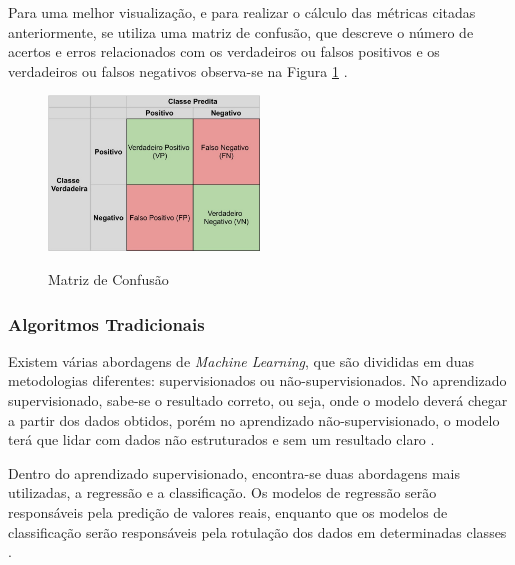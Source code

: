 Para uma melhor visualização, e para realizar o cálculo das métricas citadas anteriormente, se utiliza uma matriz de confusão, que descreve o número de acertos e erros relacionados com os verdadeiros ou falsos positivos e os verdadeiros ou falsos negativos observa-se na Figura \ref{fig:confusionMatrix} \cite{machineLearningTensorFlow}.

\begin{figure}[!htb]
	\centering
	\caption{Matriz de Confusão}
	\includegraphics[width=0.50\textwidth]{img/confusionMatrix.jpg}
	\label{fig:confusionMatrix}
\end{figure}

\subsubsection{Algoritmos Tradicionais}

Existem várias abordagens de \emph{Machine Learning}, que são divididas em duas metodologias diferentes: supervisionados ou não-supervisionados. No aprendizado supervisionado, sabe-se o resultado correto, ou seja, onde o modelo deverá chegar a partir dos dados obtidos, porém no aprendizado não-supervisionado, o modelo terá que lidar com dados não estruturados e sem um resultado claro \cite{machineLearningPython}.

Dentro do aprendizado supervisionado, encontra-se duas abordagens mais utilizadas, a regressão e a classificação. Os modelos de regressão serão responsáveis pela predição de valores reais, enquanto que os modelos de classificação serão responsáveis pela rotulação dos dados em determinadas classes \cite{machineLearningPython}.


